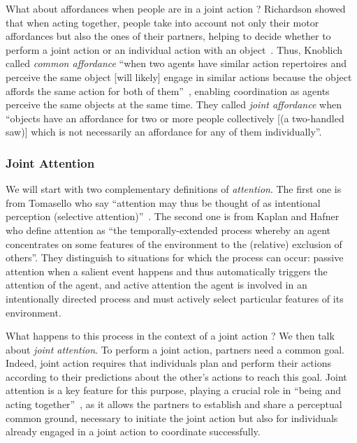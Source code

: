 \documentclass[a4paper,11pt,twoside]{StyleThese}
\begin{document}
What about affordances when people are in a joint action ? Richardson \etal{} showed that when acting together, people take into account not only their motor affordances but also the ones of their partners, helping to decide whether to perform a joint action or an individual action with an object~\cite{richardson_2007_judging}. Thus, Knoblich \etal{} called \textit{common affordance} ``when two agents have similar action repertoires and perceive the same object [will likely] engage in similar actions because the object affords the same action for both of them''~\cite[p.~63]{knoblich_2011_joint}, enabling coordination as agents perceive the same objects at the same time. They called \textit{joint affordance} when ``objects have an affordance for two or more people collectively [(a two-handled saw)] which is not necessarily an affordance for any of them individually''.


\subsubsection{Joint Attention}\label{chap1:subsubsec:joint_att}
We will start with two complementary definitions of \textit{attention}. The first one is from Tomasello \etal{} who say ``attention may thus be thought of as intentional perception (selective attention)''~\cite{tomasello_2005_understanding}. The second one is from Kaplan and Hafner~\cite{kaplan_2006_challenges} who define attention as ``the temporally-extended process whereby an agent concentrates on some features of the environment to the (relative) exclusion of others''. They distinguish to situations for which the process can occur: passive attention when a salient event happens and thus automatically triggers the attention of the agent, and active attention the agent is involved in an
intentionally directed process and must actively select particular features of its environment. 

What happens to this process in the context of a joint action ? We then talk about \textit{joint attention}. To perform a joint action, partners need a common goal. Indeed, joint action requires that individuals plan and perform their actions according to their predictions about the other’s actions to reach this goal. Joint attention is a key feature for this purpose, playing a crucial role in ``being and acting together''~\cite{tomasello_2009_cultural}, as it allows the partners to establish and share a perceptual common ground, necessary to initiate the joint action but also for individuals already engaged in a joint action to coordinate successfully. 
\end{document}
